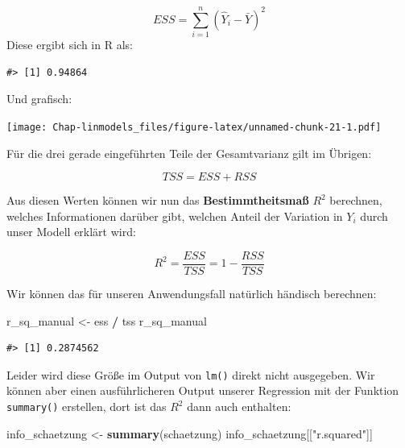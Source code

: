 \documentclass[]{book}
\newenvironment{Shaded}{\begin{snugshade}}{\end{snugshade}}
\newcommand{\KeywordTok}[1]{\textcolor[rgb]{0.13,0.29,0.53}{\textbf{#1}}}
\newcommand{\DecValTok}[1]{\textcolor[rgb]{0.00,0.00,0.81}{#1}}
\newcommand{\StringTok}[1]{\textcolor[rgb]{0.31,0.60,0.02}{#1}}
\newcommand{\OperatorTok}[1]{\textcolor[rgb]{0.81,0.36,0.00}{\textbf{#1}}}
\newcommand{\NormalTok}[1]{#1}
\begin{document}
\[ESS=\sum_{i=1}^n(\hat{Y}_i-\bar{Y})^2\] Diese ergibt sich in R als:

\begin{Shaded}
\end{Shaded}

\begin{verbatim}
#> [1] 0.94864
\end{verbatim}

Und grafisch:

\texttt{[image: Chap-linmodels\_files/figure-latex/unnamed-chunk-21-1.pdf]}

Für die drei gerade eingeführten Teile der Gesamtvarianz gilt im
Übrigen:

\[TSS=ESS+RSS\]

Aus diesen Werten können wir nun das \textbf{Bestimmtheitsmaß} \(R^2\)
berechnen, welches Informationen darüber gibt, welchen Anteil der
Variation in \(Y_i\) durch unser Modell erklärt wird:

\[R^2=\frac{ESS}{TSS}=1-\frac{RSS}{TSS}\]

Wir können das für unseren Anwendungsfall natürlich händisch berechnen:

\begin{Shaded}
\begin{Highlighting}[]
\NormalTok{r_sq_manual <-}\StringTok{ }\NormalTok{ess }\OperatorTok{/}\StringTok{ }\NormalTok{tss}
\NormalTok{r_sq_manual}
\end{Highlighting}
\end{Shaded}

\begin{verbatim}
#> [1] 0.2874562
\end{verbatim}

Leider wird diese Größe im Output von \texttt{lm()} direkt nicht
ausgegeben. Wir können aber einen ausführlicheren Output unserer
Regression mit der Funktion \texttt{summary()} erstellen, dort ist das
\(R^2\) dann auch enthalten:

\begin{Shaded}
\begin{Highlighting}[]
\NormalTok{info_schaetzung <-}\StringTok{ }\KeywordTok{summary}\NormalTok{(schaetzung)}
\NormalTok{info_schaetzung[[}\StringTok{"r.squared"}\NormalTok{]]}
\end{Highlighting}
\end{Shaded}
\end{document}
